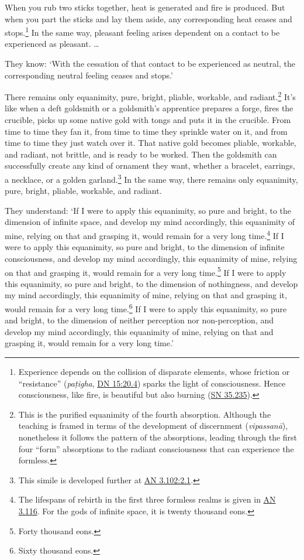 \documentclass[12pt,openany]{book}%
\begin{document}
When you rub two sticks together, heat is generated and fire is produced. But when you part the sticks and lay them aside, any corresponding heat ceases and stops.\footnote{Experience depends on the collision of disparate elements, whose friction or “resistance” (\textit{\textsanskrit{paṭigha}}, \href{https://suttacentral.net/dn15/en/sujato\#20.4}{DN 15:20.4}) sparks the light of consciousness. Hence consciousness, like fire, is beautiful but also burning (\href{https://suttacentral.net/sn35.235/en/sujato}{SN 35.235}). } In the same way, pleasant feeling arises dependent on a contact to be experienced as pleasant. … 

They know: ‘With the cessation of that contact to be experienced as neutral, the corresponding neutral feeling ceases and stops.’ 

There remains only equanimity, pure, bright, pliable, workable, and radiant.\footnote{This is the purified equanimity of the fourth absorption. Although the teaching is framed in terms of the development of discernment (\textit{\textsanskrit{vipassanā}}), nonetheless it follows the pattern of the absorptions, leading through the first four “form” absorptions to the radiant consciousness that can experience the formless. } It’s like when a deft goldsmith or a goldsmith’s apprentice prepares a forge, fires the crucible, picks up some native gold with tongs and puts it in the crucible. From time to time they fan it, from time to time they sprinkle water on it, and from time to time they just watch over it. That native gold becomes pliable, workable, and radiant, not brittle, and is ready to be worked. Then the goldsmith can successfully create any kind of ornament they want, whether a bracelet, earrings, a necklace, or a golden garland.\footnote{This simile is developed further at \href{https://suttacentral.net/an3.102/en/sujato\#2.1}{AN 3.102:2.1}. } In the same way, there remains only equanimity, pure, bright, pliable, workable, and radiant. 

They understand: ‘If I were to apply this equanimity, so pure and bright, to the dimension of infinite space, and develop my mind accordingly, this equanimity of mine, relying on that and grasping it, would remain for a very long time.\footnote{The lifespans of rebirth in the first three formless realms is given in \href{https://suttacentral.net/an3.116/en/sujato}{AN 3.116}. For the gods of infinite space, it is twenty thousand eons. } If I were to apply this equanimity, so pure and bright, to the dimension of infinite consciousness, and develop my mind accordingly, this equanimity of mine, relying on that and grasping it, would remain for a very long time.\footnote{Forty thousand eons. } If I were to apply this equanimity, so pure and bright, to the dimension of nothingness, and develop my mind accordingly, this equanimity of mine, relying on that and grasping it, would remain for a very long time.\footnote{Sixty thousand eons. } If I were to apply this equanimity, so pure and bright, to the dimension of neither perception nor non-perception, and develop my mind accordingly, this equanimity of mine, relying on that and grasping it, would remain for a very long time.’ 
\end{document}
